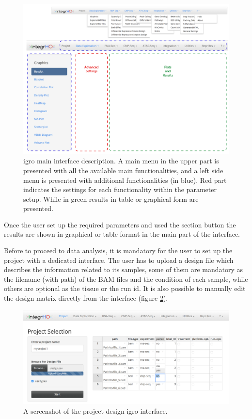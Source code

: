 \begin{figure}[H]
\centering
\includegraphics[width=\textwidth, keepaspectratio]{img/integrho/interface.png}
\caption[\gls{igro} main interface]{\gls{igro} main interface description. A main menu in the upper part is presented with all the available main functionalities, and a left side menu is presented with additional functionalities (in blue). Red part indicates the settings for each functionality within the parameter setup. While in green results in table or graphical form are presented.}
\label{fig:integrhomain}
\end{figure}

Once the user set up the required parameters and used the section button the results are shown in graphical or table format in the main part of the interface.

Before to proceed to data analysis, it is mandatory for the user to set up the project with a dedicated interface. 
The user has to upload a design file which describes the information related to its samples, some of them are mandatory as the filename (with path) of the BAM files and the condition of each sample, while others are optional as the tissue or the run id. 
It is also possible to manually edit the design matrix directly from the interface (figure \ref{fig:integrhodesign}).

\begin{figure}[H]
\centering
\includegraphics[width=\textwidth, keepaspectratio]{img/integrho/design.png}
\caption[integrho design interface]{A screenshot of the project design \gls{igro} interface.}
\label{fig:integrhodesign}
\end{figure}

